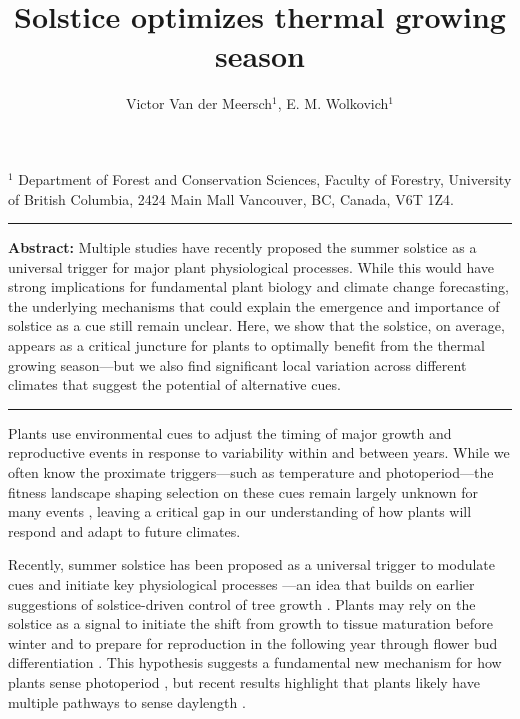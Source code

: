 \documentclass[11pt,letter]{article}
\begin{document}
\title{Solstice optimizes thermal growing season}

\author{Victor Van der Meersch$^{1}$, E. M. Wolkovich$^{1}$}
\date{}
\maketitle 

$^1$ Department of Forest and Conservation Sciences, Faculty of Forestry, University of British Columbia, 2424 Main Mall
Vancouver, BC, Canada, V6T 1Z4. \\

\noindent\rule{\textwidth}{0.3pt}
\textbf{Abstract:} Multiple studies have recently proposed the summer solstice as a universal trigger for major plant physiological processes. While this would have strong implications for fundamental plant biology and climate change forecasting, the underlying mechanisms that could explain the emergence and importance of solstice as a cue still remain unclear. Here, we show that the solstice, on average, appears as a critical juncture for plants to optimally benefit from the thermal growing season---but we also find significant local variation across different climates that suggest the potential of alternative cues. %

\noindent\rule{\textwidth}{0.3pt}

\vspace{0.3cm}

\linenumbers

Plants use environmental cues to adjust the timing of major growth and reproductive events in response to variability within and between years. While we often know the proximate triggers---such as temperature and photoperiod---the fitness landscape shaping selection on these cues remain largely unknown for many events \citep{Chuine2017}, leaving a critical gap in our understanding of how plants will respond and adapt to future climates.

Recently, summer solstice has been proposed as a universal trigger to modulate cues and initiate key physiological processes \citep{Zohner2023, Journe2024}---an idea that builds on earlier suggestions of solstice-driven control of tree growth \citep{Rossi2006}. 
Plants may rely on the solstice as a signal to initiate the shift from growth to tissue maturation before winter and to prepare for reproduction in the following year through flower bud differentiation \citep{Rossi2006, Zohner2023, Journe2024}. This hypothesis suggests a fundamental new mechanism for how plants sense photoperiod \citep{Gendron2023}, but recent results highlight that plants likely have multiple pathways to sense daylength  \citep{wang2024plants}.
\end{document}
